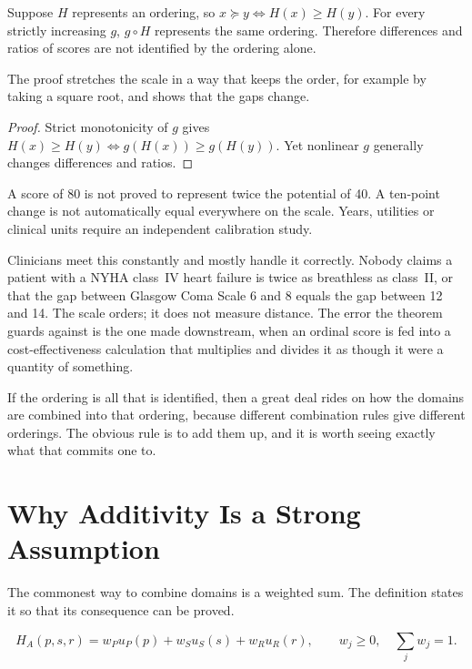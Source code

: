 \begin{theorem}
Suppose $H$ represents an ordering, so
$x\succeq y\Leftrightarrow H(x)\ge H(y)$. For every strictly increasing
$g$, $g\circ H$ represents the same ordering. Therefore differences and ratios
of scores are not identified by the ordering alone.
\end{theorem}
The proof stretches the scale in a way that keeps the order, for example by
taking a square root, and shows that the gaps change.
\begin{proof}
Strict monotonicity of $g$ gives
$H(x)\ge H(y)\Leftrightarrow g(H(x))\ge g(H(y))$. Yet nonlinear $g$
generally changes differences and ratios.
\end{proof}

\begin{remark}
A score of 80 is not proved to represent twice the potential of 40. A
ten-point change is not automatically equal everywhere on the scale. Years,
utilities or clinical units require an independent calibration study.
\end{remark}

Clinicians meet this constantly and mostly handle it correctly. Nobody claims a
patient with a NYHA class~IV heart failure is twice as breathless as class~II,
or that the gap between Glasgow Coma Scale 6 and 8 equals the gap between 12
and 14. The scale orders; it does not measure distance. The error the theorem
guards against is the one made downstream, when an ordinal score is fed into a
cost-effectiveness calculation that multiplies and divides it as though it were
a quantity of something.

If the ordering is all that is identified, then a great deal rides on how the
domains are combined into that ordering, because different combination rules
give different orderings. The obvious rule is to add them up, and it is worth
seeing exactly what that commits one to.

\section{Why Additivity Is a Strong Assumption}
\label{app:a-additivity}

The commonest way to combine domains is a weighted sum. The definition states
it so that its consequence can be proved.

\begin{definition}
\[
H_A(p,s,r)=w_Pu_P(p)+w_Su_S(s)+w_Ru_R(r),\qquad
w_j\ge0,\quad\sum_jw_j=1.
\]
\end{definition}

